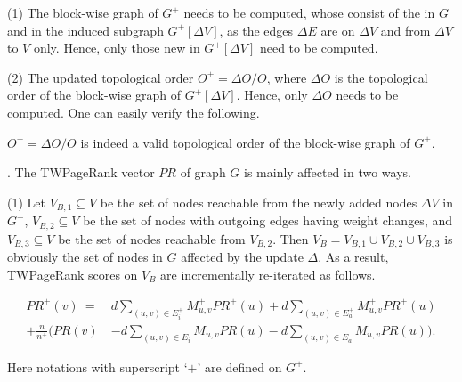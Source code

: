 

\sstab(1) The block-wise graph of $G^+$ needs to be computed, whose \sccs consist of the \sccs in $G$ and \sccs in the induced subgraph $G^+[\Delta V]$, as  the edges $\Delta E$ are  on $\Delta V$ and from $\Delta V$  to $V$ only. Hence, only those new \sccs in $G^+[\Delta V]$ need to be computed.

\sstab(2) The updated topological order $O^+=\Delta O/O$, where $\Delta O$ is the topological order of the block-wise graph of $G^+[\Delta V]$. Hence, only $\Delta O$ needs to be computed. One can easily verify the following.


\begin{prop} \label{lemma-inc-topo}
 $O^+=\Delta O/O$ is indeed a valid topological order of the block-wise graph of $G^+$.
\end{prop}



.
The TWPageRank vector $PR$ of graph $G$ is mainly affected in two ways.



\sstab(1) Let $V_{B,1}\subseteq V$ be the set of nodes reachable from the newly added nodes $\Delta V$ in $G^+$, $V_{B,2}\subseteq V$ be the set of nodes with outgoing edges having weight changes, and $V_{B,3}\subseteq V$ be the set of nodes reachable from  $V_{B,2}$.
%
Then $V_B=V_{B,1}\cup V_{B,2}\cup V_{B,3}$ is obviously the set of nodes in $G$ affected by the update $\Delta$.
%
As a result, TWPageRank scores on $V_B$ are incrementally re-iterated as follows.
%
\begin{small}
\begin{equation}\label{eq-inc-prscc}
\begin{split}
PR^+(v) \ = \ &  d \sum_{(u,v)\in E^+_i} M^+_{u,v} PR^+(u) + d \sum_{(u,v)\in E^+_a} M^+_{u,v} PR^+(u)  \\
 + \frac{n}{n^+} \Big( PR(v) &  - d \sum_{(u,v)\in E_i} M_{u,v} PR(u) - d\sum_{(u,v)\in E_a} M_{u,v} PR(u)\Big).
\end{split}
\end{equation}
\vspace{-2ex}
\end{small}
Here notations with superscript `$+$' are defined on  $G^+$.

